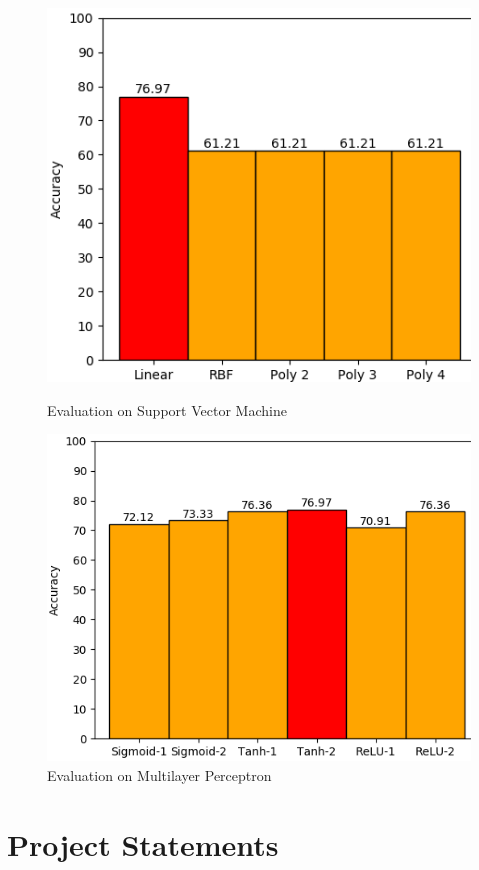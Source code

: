 \documentclass[a4paper,oneside]{article}
\begin{document}
\begin{figure}[h]
	\centering
	\begin{minipage}[t]{8.6cm}
\includegraphics[width=0.8\linewidth]{SVM}
  \centering
  \caption{Evaluation on Support Vector Machine}
  \label{fig:SVM}
	\end{minipage}
	\begin{minipage}[t]{8.6cm}
	\includegraphics[width=0.92\linewidth]{MLP}
  \centering
  \caption{Evaluation on Multilayer Perceptron}
  \label{fig:MLP}
	\end{minipage}
\end{figure}


\section{Project Statements}
\end{document}
